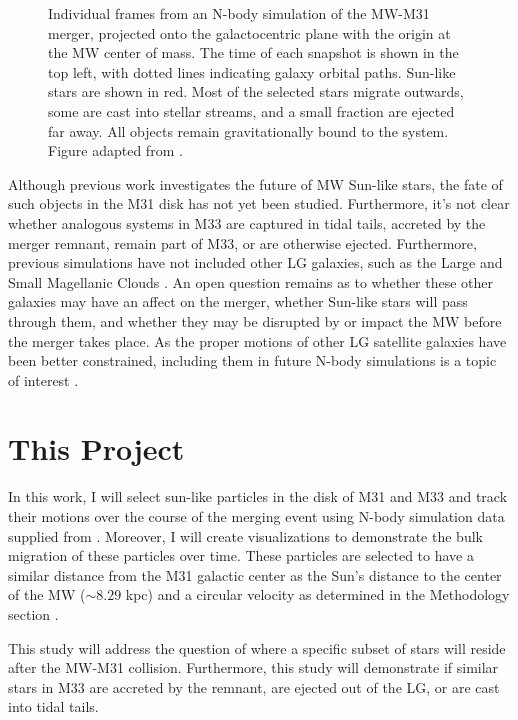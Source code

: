 \documentclass[twocolumn]{aastex631}
\begin{document}
\begin{figure}[ht!]
\caption{Individual frames from an N-body simulation of the MW-M31 merger, projected onto the galactocentric plane with the origin at the MW center of mass. The time of each snapshot is shown in the top left, with dotted lines indicating galaxy orbital paths. Sun-like stars are shown in red. Most of the selected stars migrate outwards, some are cast into stellar streams, and a small fraction are ejected far away. All objects remain gravitationally bound to the system. Figure adapted from \citet{2012ApJ...753....9V}.
\label{fig1}}
\end{figure}

Although previous work investigates the future of MW Sun-like stars, the fate of such objects in the M31 disk has not yet been studied. Furthermore, it's not clear whether analogous systems in M33 are captured in tidal tails, accreted by the merger remnant, remain part of M33, or are otherwise ejected. Furthermore, previous simulations have not included other LG galaxies, such as the Large and Small Magellanic Clouds \citep{1996ApJ...462..576D}\citep{2008MNRAS.386..461C}\citep{2012ApJ...753....9V}. An open question remains as to whether these other galaxies may have an affect on the merger, whether Sun-like stars will pass through them, and whether they may be disrupted by or impact the MW before the merger takes place. As the proper motions of other LG satellite galaxies have been better constrained, including them in future N-body simulations is a topic of interest \citep{2015IAUS..311....1V}.

\section{This Project \label{sec:this-project}}
In this work, I will select sun-like particles in the disk of M31 and M33 and track their motions over the course of the merging event using N-body simulation data supplied from \citet{2012ApJ...753....9V}. Moreover, I will create visualizations to demonstrate the bulk migration of these particles over time. These particles are selected to have a similar distance from the M31 galactic center as the Sun's distance to the center of the MW ($\sim 8.29$ kpc) and a circular velocity as determined in the Methodology section \citep{2012ApJ...753....8V}.

This study will address the question of where a specific subset of stars will reside after the MW-M31 collision. Furthermore, this study will demonstrate if similar stars in M33 are accreted by the remnant, are ejected out of the LG, or are cast into tidal tails.
\end{document}
